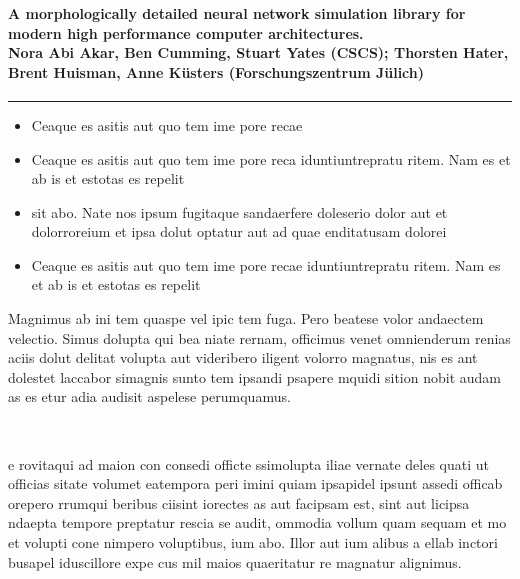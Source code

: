 \documentclass{beamer}
\begin{document}
\begin{frame}[t]
  \frametitle{ }
   \framesubtitle{A morphologically detailed neural network simulation library for modern high performance computer architectures.\\
  \tiny{Nora Abi Akar, Ben Cumming, Stuart Yates (CSCS); Thorsten Hater, Brent Huisman, Anne Küsters (Forschungszentrum Jülich)}}

  \begin{appendixblock}
    \begin{minipage}[c]{.48\linewidth}
      \centering
      \color{fzjblue}\rule{0.9\linewidth}{0.2\paperheight}
    \end{minipage}
    \hfill
    \begin{minipage}[c]{.48\linewidth}
      \begin{itemize}
      \item Ceaque es asitis aut quo tem ime pore recae
      \item Ceaque es asitis aut quo tem ime pore reca
        iduntiuntrepratu ritem. Nam es et ab is et estotas es repelit
      \item sit abo. Nate nos ipsum fugitaque sandaerfere doleserio
        dolor aut et dolorroreium et ipsa dolut optatur aut ad quae
        enditatusam dolorei
      \item Ceaque es asitis aut quo tem ime pore recae
        iduntiuntrepratu ritem. Nam es et ab is et estotas es repelit
      \end{itemize}
    \end{minipage}
  \end{appendixblock}

  Magnimus ab ini tem quaspe vel ipic tem fuga. Pero beatese volor
  andaectem velectio. Simus dolupta qui bea niate rernam, officimus
  venet omnienderum renias aciis dolut delitat volupta aut videribero
  iligent volorro magnatus, nis es ant dolestet laccabor simagnis
  sunto tem ipsandi psapere mquidi sition nobit audam as es etur adia
  audisit aspelese perumquamus.\\[1.5ex]

  \begin{columns}[onlytextwidth]
    \begin{column}{.49\linewidth}
      \textbf{}\\
      e rovitaqui ad maion con consedi officte ssimolupta iliae
      vernate deles quati ut officias sitate volumet eatempora peri
      imini quiam ipsapidel ipsunt assedi officab orepero rrumqui
      beribus ciisint iorectes as aut facipsam est, sint aut licipsa
      ndaepta tempore preptatur rescia se audit, ommodia vollum quam
      sequam et mo et volupti cone nimpero voluptibus, ium abo. Illor
      aut ium alibus a ellab inctori busapel iduscillore expe cus mil
      maios quaeritatur re magnatur alignimus.\\[1ex]


\end{column}
\end{columns}
\end{frame}
\end{document}
